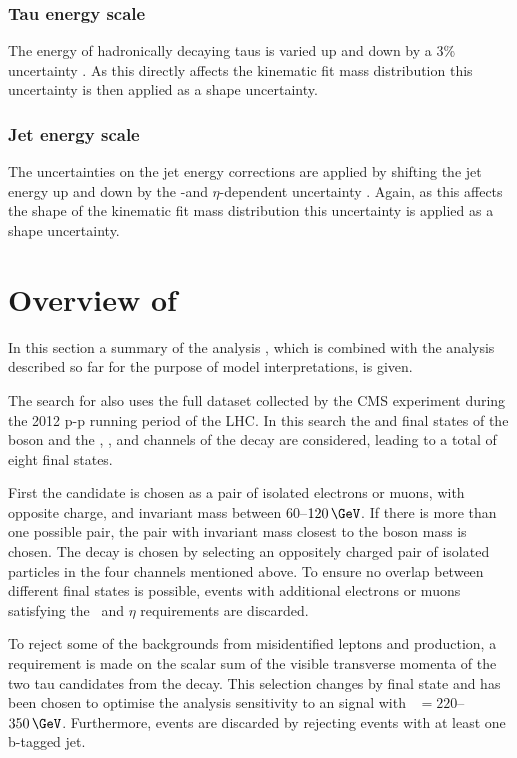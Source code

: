 \subsubsection*{Tau energy scale}
The energy of hadronically decaying taus is varied up and down by a 3\% uncertainty \cite{SMHtautauCMS}. As this directly affects the kinematic fit mass distribution this uncertainty is then applied as a shape uncertainty.
\subsubsection*{Jet energy scale}
The uncertainties on the jet energy corrections are applied by shifting the jet energy up and down by the \pT-and $\eta$-dependent uncertainty \cite{cms-jec-2011}. Again, as this affects the shape of the kinematic fit mass distribution this uncertainty is applied as a shape uncertainty.
\section{\texorpdfstring{Overview of \AtoZhtolltautau}{Overview of A->Zh->lltautau}}
\label{sec:hhh_azh}
In this section a summary of the \AtoZhtolltautau analysis \cite{CMS-HIG-14-034}, which is combined with the 
analysis described so far for the purpose of model interpretations, is given.

The search for \AtoZhtolltautau also uses the full dataset collected by the CMS experiment during
the 2012 p-p running period of the \ac{LHC}. In this search the \mumu and \ee final states of the \PZ boson
and the \emu, \etau, \mutau and \tautau channels of the \htotautau decay are considered, leading to a total of
eight final states. 

First the \PZ candidate is chosen as a pair of isolated electrons or muons, with opposite charge, and 
invariant mass between $60$--$120\,\GeV$. If there is more than one possible pair, the 
pair with invariant mass closest to the \PZ boson mass is chosen. The \htotautau decay is chosen by selecting
an oppositely charged pair of isolated particles in the four channels mentioned above. To ensure no overlap
between different final states is possible, events with additional electrons or muons satisfying the
\pT~and $\eta$ requirements are discarded.

To reject some of the backgrounds from misidentified leptons and \ZZ production, a requirement is made
on the scalar sum of the visible transverse momenta of the two tau candidates from the \htotautau decay.
This selection changes by final state and has been chosen to optimise the analysis sensitivity to an 
\AtoZh signal with \mA~$= 220$--$350\,\GeV$. Furthermore, \ttbar events are discarded by rejecting
events with at least one b-tagged jet. 

